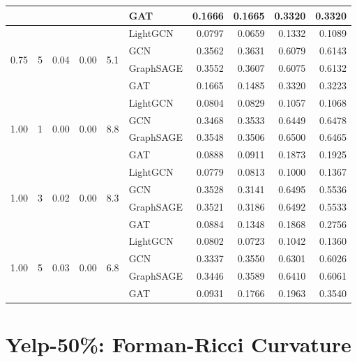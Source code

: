 {\begin{longtable}{cccccl rrrr}
 & & & & & GAT & 0.1666 & 0.1665 & 0.3320 & 0.3320 \\
\midrule
\multirow{4}{*}{0.75} & \multirow{4}{*}{5} & \multirow{4}{*}{0.04} & \multirow{4}{*}{0.00} & \multirow{4}{*}{5.1} & LightGCN & 0.0797 & 0.0659 & 0.1332 & 0.1089 \\
 & & & & & GCN & 0.3562 & 0.3631 & 0.6079 & 0.6143 \\
 & & & & & GraphSAGE & 0.3552 & 0.3607 & 0.6075 & 0.6132 \\
 & & & & & GAT & 0.1665 & 0.1485 & 0.3320 & 0.3223 \\
\midrule
\multirow{4}{*}{1.00} & \multirow{4}{*}{1} & \multirow{4}{*}{0.00} & \multirow{4}{*}{0.00} & \multirow{4}{*}{8.8} & LightGCN & 0.0804 & 0.0829 & 0.1057 & 0.1068 \\
 & & & & & GCN & 0.3468 & 0.3533 & 0.6449 & 0.6478 \\
 & & & & & GraphSAGE & 0.3548 & 0.3506 & 0.6500 & 0.6465 \\
 & & & & & GAT & 0.0888 & 0.0911 & 0.1873 & 0.1925 \\
\midrule
\multirow{4}{*}{1.00} & \multirow{4}{*}{3} & \multirow{4}{*}{0.02} & \multirow{4}{*}{0.00} & \multirow{4}{*}{8.3} & LightGCN & 0.0779 & 0.0813 & 0.1000 & 0.1367 \\
 & & & & & GCN & 0.3528 & 0.3141 & 0.6495 & 0.5536 \\
 & & & & & GraphSAGE & 0.3521 & 0.3186 & 0.6492 & 0.5533 \\
 & & & & & GAT & 0.0884 & 0.1348 & 0.1868 & 0.2756 \\
\midrule
\multirow{4}{*}{1.00} & \multirow{4}{*}{5} & \multirow{4}{*}{0.03} & \multirow{4}{*}{0.00} & \multirow{4}{*}{6.8} & LightGCN & 0.0802 & 0.0723 & 0.1042 & 0.1360 \\
 & & & & & GCN & 0.3337 & 0.3550 & 0.6301 & 0.6026 \\
 & & & & & GraphSAGE & 0.3446 & 0.3589 & 0.6410 & 0.6061 \\
 & & & & & GAT & 0.0931 & 0.1766 & 0.1963 & 0.3540 \\
\midrule
\end{longtable}
}

\section{Yelp-50\%: Forman-Ricci Curvature}

